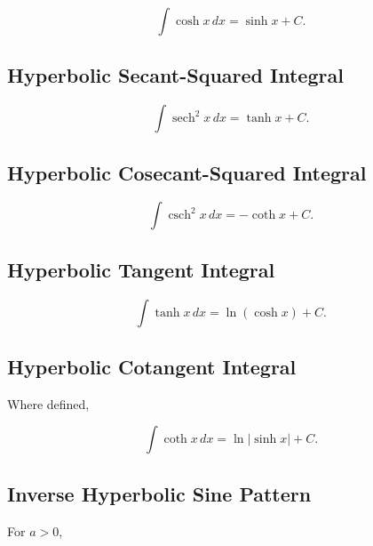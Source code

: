 \[
\boxed{
\int\cosh x\,dx
=
\sinh x+C.
}
\]

\subsection{Hyperbolic Secant-Squared Integral}
\label{subsec:sech-squared-integral}

\[
\boxed{
\int
\operatorname{sech}^2x
\,dx
=
\tanh x+C.
}
\]

\subsection{Hyperbolic Cosecant-Squared Integral}
\label{subsec:csch-squared-integral}

\[
\boxed{
\int
\operatorname{csch}^2x
\,dx
=
-\coth x+C.
}
\]

\subsection{Hyperbolic Tangent Integral}
\label{subsec:tanh-integral-reference}

\[
\boxed{
\int\tanh x\,dx
=
\ln(\cosh x)+C.
}
\]

\subsection{Hyperbolic Cotangent Integral}
\label{subsec:coth-integral-reference}

Where defined,

\[
\boxed{
\int\coth x\,dx
=
\ln|\sinh x|+C.
}
\]

\subsection{Inverse Hyperbolic Sine Pattern}
\label{subsec:inverse-hyperbolic-sine-integral}

For \(a>0\),

